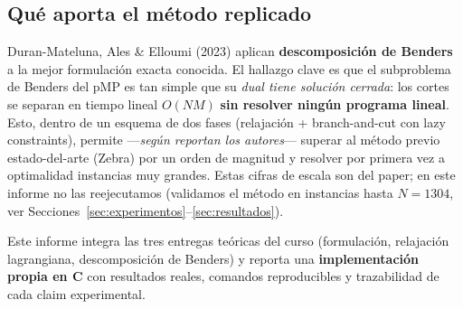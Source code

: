 \subsection{Qué aporta el método replicado}
Duran-Mateluna, Ales \& Elloumi (2023) aplican \textbf{descomposición de Benders} a la mejor
formulación exacta conocida. El hallazgo clave es que el subproblema de Benders del pMP es tan
simple que su \emph{dual tiene solución cerrada}: los cortes se separan en tiempo lineal $O(NM)$
\textbf{sin resolver ningún programa lineal}. Esto, dentro de un esquema de dos fases (relajación
+ branch-and-cut con lazy constraints), permite —\emph{según reportan los autores}— superar al
método previo estado-del-arte (Zebra) por un orden de magnitud y resolver por primera vez a
optimalidad instancias muy grandes. Estas cifras de escala son del paper; en este informe no las
reejecutamos (validamos el método en instancias hasta $N=1304$, ver Secciones~\ref{sec:experimentos}–\ref{sec:resultados}).

Este informe integra las tres entregas teóricas del curso (formulación, relajación lagrangiana,
descomposición de Benders) y reporta una \textbf{implementación propia en C} con resultados
reales, comandos reproducibles y trazabilidad de cada claim experimental.
